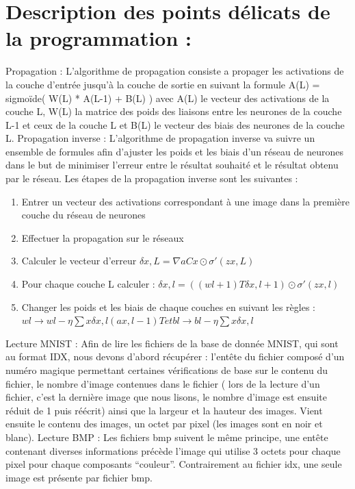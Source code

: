 \documentclass{article}
\begin{document}
\section{Description des points délicats de la programmation :}
Propagation :
L'algorithme de propagation consiste a propager les activations de la couche d'entrée jusqu'à la couche de sortie en suivant la formule A(L) = sigmoïde( W(L) * A(L-1) + B(L) ) avec A(L) le vecteur des activations de la couche L, W(L) la matrice des poids des liaisons entre les neurones de la couche L-1 et ceux de la couche L et B(L) le vecteur des biais des neurones de la couche L.
Propagation inverse :
L'algorithme de propagation inverse va suivre un ensemble de formules afin d'ajuster les poids et les biais d'un réseau de neurones dans le but de minimiser l'erreur entre le résultat souhaité et le résultat obtenu par le réseau. Les étapes de la propagation inverse sont les suivantes :
		\begin{enumerate}
			\item Entrer un vecteur des activations correspondant à une image dans la première couche du réseau de neurones
			\item Effectuer la propagation sur le réseaux
			\item Calculer le vecteur d'erreur $δx,L=∇aCx⊙σ′(zx,L)$
			\item Pour chaque couche L calculer : $δx,l=((wl+1)Tδx,l+1)⊙σ′(zx,l)$
			\item Changer les poids et les biais de chaque couches en suivant les règles : $wl→wl−η∑xδx,l(ax,l−1)T et bl→bl−η∑xδx,l$
		\end{enumerate}
Lecture MNIST :
Afin de lire les fichiers de la base de donnée MNIST, qui sont au format IDX, nous devons d'abord récupérer : l'entête du fichier composé d'un numéro magique permettant certaines vérifications de base sur le contenu du fichier, le nombre d'image contenues dans le fichier ( lors de la lecture d'un fichier, c'est la dernière image que nous lisons, le nombre d'image est ensuite réduit de 1 puis réécrit) ainsi que la largeur et la hauteur des images. Vient ensuite le contenu des images, un octet par pixel (les images sont en noir et blanc).
Lecture BMP :
Les fichiers bmp suivent le même principe, une entête contenant diverses informations précède l'image qui utilise 3 octets pour chaque pixel pour chaque composants "`couleur"'. Contrairement au fichier idx, une seule image est présente par fichier bmp.
\end{document}
